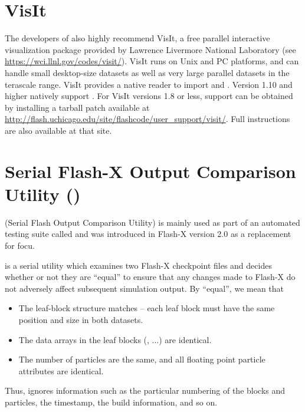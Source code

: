 
\chapter{VisIt}
\label{Sec:visit}
The developers of  also highly recommend VisIt, a free parallel interactive
visualization
package provided by Lawrence Livermore National Laboratory 
(see \url{https://wci.llnl.gov/codes/visit/}).
VisIt runs on Unix and PC platforms, and can handle small desktop-size datasets
as well as very large parallel datasets in the terascale range.  VisIt
provides a native reader to import  and \flashx.
Version 1.10 and higher natively
support \flashx.
For VisIt versions 1.8 or less, \flashx support can be obtained by installing
a tarball patch available at 
\url{http://flash.uchicago.edu/site/flashcode/user_support/visit/}.
Full instructions are also available at that site.


\chapter{Serial Flash-X Output Comparison Utility ()}
\label{Chp:sfocu}

 (Serial Flash Output Comparison Utility) is mainly used as part of
an automated testing suite called  and was introduced in Flash-X
version 2.0 as a replacement for focu.

 is a serial utility which examines two Flash-X checkpoint files and
decides whether or not they are ``equal'' to ensure that any changes made to Flash-X do
not adversely affect subsequent simulation output.  By ``equal'', we mean
that

\begin{itemize} \item The leaf-block structure matches -- each leaf block
must have the same position and size in both datasets.

\item The data arrays in the leaf blocks (, ...) are
identical.

\item The number of particles are the same, and all floating point particle
attributes are identical.
\end{itemize}

Thus,  ignores information such as the particular numbering of the
blocks and particles, the timestamp, the build information, and so on.

